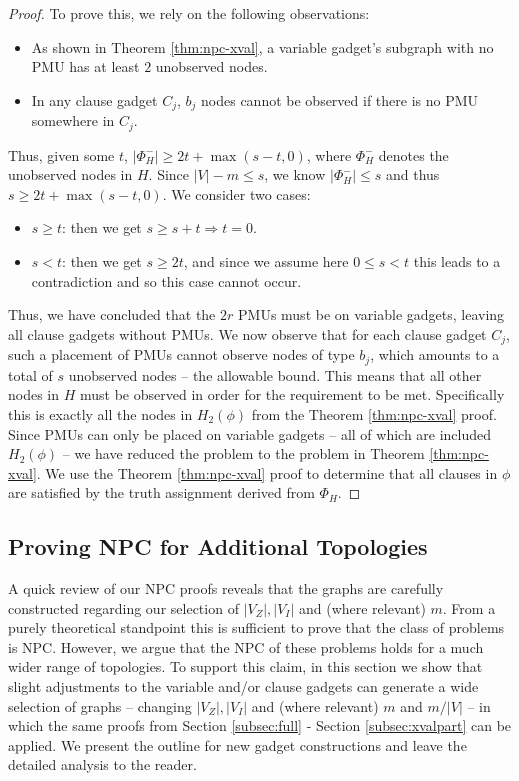 \begin{proof}
To prove this, we rely on the following observations:
\begin{itemize}
	\item As shown in Theorem \ref{thm:npc-xval}, a variable gadget's subgraph with no PMU has at least $2$ unobserved nodes.
	\item In any clause gadget $C_j$, $b_j$ nodes cannot be observed if there is no PMU somewhere in $C_j$.
\end{itemize}
Thus, given some $t$, $|\Phi_H^-| \geq 2t + \max(s-t, 0)$, where $\Phi_H^-$ denotes the unobserved nodes in $H$. Since $|V|-m \leq s$, we know $|\Phi_H^-|\leq s$ and thus 
$s \geq 2t + \max(s-t, 0)$. We consider two cases:
\begin{itemize}
	\item $s\geq t$: then we get $s \geq s+t \Rightarrow t=0.$
	\item $s < t$:	then we get $s \geq 2t$, and since we assume here $0\leq s < t$ this leads to a contradiction and so this case cannot occur.
\end{itemize}

Thus, we have concluded that the $2r$ PMUs must be on variable gadgets, leaving all clause gadgets without PMUs. %
We now observe that for each clause gadget $C_j$, such a placement of PMUs cannot observe nodes of type  $b_j$, which amounts to a total of $s$ unobserved nodes -- the allowable bound.
This means that all other nodes in $H$ must be observed in order for the requirement to be met. Specifically this is exactly all the nodes in $H_2(\phi)$ from the Theorem \ref{thm:npc-xval} proof. Since PMUs can only be placed on
variable gadgets -- all of which are included $H_2(\phi)$ -- we have reduced the problem to the problem in Theorem \ref{thm:npc-xval}. We use
the Theorem \ref{thm:npc-xval} proof to determine that all clauses in $\phi$ are satisfied by the truth assignment derived from $\Phi_H$. 
\end{proof}



\subsection{Proving NPC for Additional Topologies} %
\label{subsec:extend}

A quick review of our NPC proofs reveals that the graphs are carefully constructed regarding our selection of $|V_Z|, |V_I|$ and (where relevant) $m$. From a purely theoretical standpoint this is sufficient to prove that the class of problems is NPC. However, we argue that the NPC of these problems holds for a much wider range of topologies. To support this claim, in this section we show that slight adjustments to the variable and/or clause gadgets can generate a wide selection of graphs -- changing  $|V_Z|, |V_I|$ and (where relevant) $m$ and $m/|V|$ -- in which the same proofs from Section \ref{subsec:full} - Section \ref{subsec:xvalpart} can be applied. We present the outline for new gadget constructions and leave the detailed analysis to the reader.


